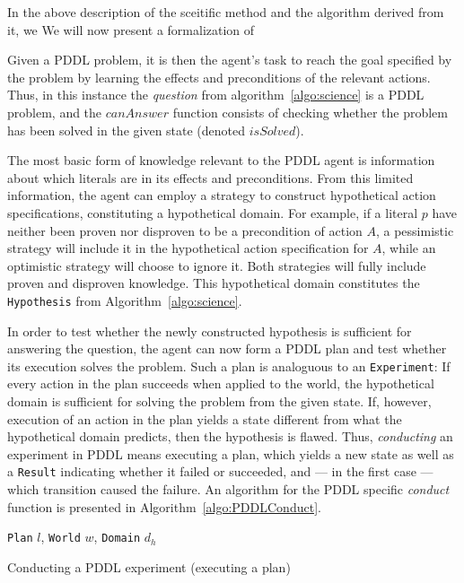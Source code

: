 \documentclass[../Master.tex]{subfiles}
\begin{document}
In the above description of the sceitific method and the algorithm derived from it, we 
We will now present a formalization of 

Given a PDDL problem, it is then the agent's task to reach the goal specified by the problem by learning the effects and preconditions of the relevant actions. Thus, in this instance the \textit{question} from algorithm~\ref{algo:science} is a PDDL problem, and the $canAnswer$ function consists of checking whether the problem has been solved in the given state (denoted $isSolved$).

The most basic form of knowledge relevant to the PDDL agent is information about which literals are in its effects and preconditions. From this limited information, the agent can employ a strategy to construct hypothetical action specifications, constituting a hypothetical domain. For example, if a literal $p$ have neither been proven nor disproven to be a precondition of action $A$, a pessimistic strategy will include it in the hypothetical action specification for $A$, while an optimistic strategy will choose to ignore it. Both strategies will fully include proven and disproven knowledge. This hypothetical domain constitutes the \texttt{Hypothesis} from Algorithm~\ref{algo:science}.

In order to test whether the newly constructed hypothesis is sufficient for answering the question, the agent can now form a PDDL plan and test whether its execution solves the problem. Such a plan is analoguous to an \texttt{Experiment}: If every action in the plan succeeds when applied to the world, the hypothetical domain is sufficient for solving the problem from the given state. If, however, execution of an action in the plan yields a state different from what the hypothetical domain predicts, then the hypothesis is flawed. Thus, \emph{conducting} an experiment in PDDL means executing a plan, which yields a new state as well as a \texttt{Result} indicating whether it failed or succeeded, and --- in the first case --- which transition caused the failure. An algorithm for the PDDL specific \textit{conduct} function is presented in Algorithm~\ref{algo:PDDLConduct}. 

\begin{algorithm}
    \begin{algorithmic}
         {\texttt{Plan} $l$, \texttt{World} $w$, \texttt{Domain} $d_h$}
            \EndIf%
        \EndFor%
        \EndFunction%
    \end{algorithmic}
    \caption{Conducting a PDDL experiment (executing a plan)}\label{algo:PDDLConduct}
\end{algorithm}
\end{document}
